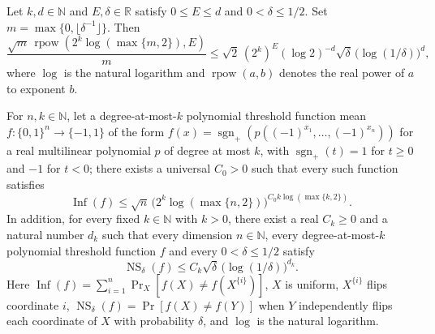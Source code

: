 \begin{lemma}
\leanok
{}
Let $k,d\in\mathbb N$ and $E,\delta\in\mathbb R$ satisfy $0\le E\le d$ and
$0<\delta\le1/2$. Set $m=\max\{0,\lfloor\delta^{-1}\rfloor\}$. Then
\[\frac{\sqrt m\,\operatorname{rpow}\!\left(2^k\log(\max\{m,2\}),E\right)}{m}\le\sqrt2\,(2^k)^E(\log2)^{-d}\sqrt\delta\,\bigl(\log(1/\delta)\bigr)^d,\]
where $\log$ is the natural logarithm and $\operatorname{rpow}(a,b)$ denotes the real
power of $a$ to exponent $b$.
\end{lemma}

\begin{theorem}
\leanok
{}
For $n,k\in\mathbb N$, let a degree-at-most-$k$ polynomial threshold function mean $f:\{0,1\}^{n}\to\{-1,1\}$ of the form $f(x)=\operatorname{sgn}_{+}(p((-1)^{x_1},\ldots,(-1)^{x_n}))$ for a real multilinear polynomial $p$ of degree at most $k$, with $\operatorname{sgn}_{+}(t)=1$ for $t\geq0$ and $-1$ for $t<0$; there exists a universal $C_0>0$ such that every such function satisfies
\[
\operatorname{Inf}(f)\leq\sqrt n\,
\bigl(2^k\log(\max\{n,2\})\bigr)^{C_0k\log(\max\{k,2\})}.
\]
In addition, for every fixed $k\in\mathbb N$ with $k>0$, there exist a real $C_k\geq0$ and a natural number $d_k$ such that every dimension $n\in\mathbb N$, every degree-at-most-$k$ polynomial threshold function $f$ and every $0<\delta\leq1/2$ satisfy
\[
\operatorname{NS}_{\delta}(f)\leq C_k\sqrt\delta\,\bigl(\log(1/\delta)\bigr)^{d_k}.
\]
Here $\operatorname{Inf}(f)=\sum_{i=1}^{n}\Pr_X[f(X)\neq f(X^{\{i\}})]$, $X$ is uniform, $X^{\{i\}}$ flips coordinate $i$, $\operatorname{NS}_{\delta}(f)=\Pr[f(X)\neq f(Y)]$ when $Y$ independently flips each coordinate of $X$ with probability $\delta$, and $\log$ is the natural logarithm.
\end{theorem}

